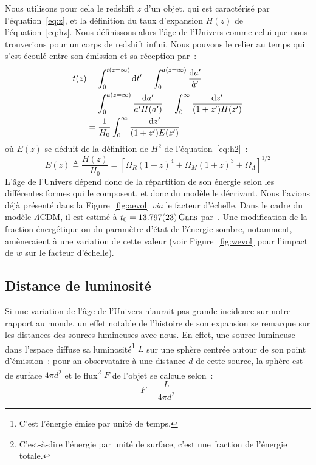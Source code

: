 \documentclass[../main/main.tex]{subfiles}
\begin{document}
Nous utilisons pour cela le redshift $z$ d'un objet, qui est caractérisé par
l'équation~\ref{eq:z}, et la définition du taux d'expansion $H(z)$ de
l'équation~\ref{eq:hz}. Nous définissons alors l'âge de l'Univers comme celui
que nous trouverions pour un corps de redshift infini. Nous pouvons le relier au
temps qui s'est écoulé entre son émission et sa réception par~:
\begin{align}
    t(z) & = \int_{0}^{t(z=\infty)} \mathrm{d} t' = \int_{0}^{a(z=\infty)} \frac{\mathrm{d} a'}{\dot{a}'}
    \nonumber\\
         & = \int_{0}^{a(z=\infty)} \frac{\mathrm{d} a'}{a'H(a')} = \int_{0}^{\infty} \frac{\mathrm{d}
         z'}{(1+z')H(z')}\nonumber\\
         & = \frac{1}{H_0} \int_{0}^{\infty} \frac{\mathrm{d} z'}{(1+z')E(z')}
\end{align}
où $E(z)$ se déduit de la définition de $H^2$ de l'équation~\ref{eq:h2}~:
\begin{equation}\label{eq:ez}
    E(z) \triangleq \frac{H(z)}{H_0} = \left[ \Omega_R(1+z)^4 + \Omega_M(1+z)^3
    + \Omega_\Lambda\right]^{1/2}
\end{equation}
L'âge de l'Univers dépend donc de la répartition de son énergie selon les
différentes formes qui le composent, et donc du modèle le décrivant. Nous
l'avions déjà présenté dans la Figure~\ref{fig:aevol} \textit{via} le facteur
d'échelle. Dans le cadre du modèle $\Lambda$CDM, il est estimé à $t_0 =
\SI{13.797\pm0.023}{Gans}$ par~\cite{planck2018}. Une modification de la
fraction énergétique ou du paramètre d'état de l'énergie sombre, notamment,
amèneraient à une variation de cette valeur (voir Figure~\ref{fig:wevol} pour
l'impact de $w$ sur le facteur d'échelle).

\subsection{Distance de luminosité}\label{ssec:dl}

Si une variation de l'âge de l'Univers n'aurait pas grande incidence sur notre
rapport au monde, un effet notable de l'histoire de son expansion se remarque
sur les distances des sources lumineuses avec nous. En effet, une source
lumineuse dans l'espace diffuse sa luminosité\footnote{C'est l'énergie émise par
unité de temps.} $L$ sur une sphère centrée autour de son point d'émission~:
pour an observataire à une distance $d$ de cette source, la sphère est de
surface $4\pi d^2$ et le flux\footnote{C'est-à-dire l'énergie par unité de
surface, c'est une fraction de l'énergie totale.} $F$ de l'objet se calcule
selon~:
\begin{equation}\label{eq:f}
    F = \frac{L}{4\pi d^2}
\end{equation}
\end{document}
